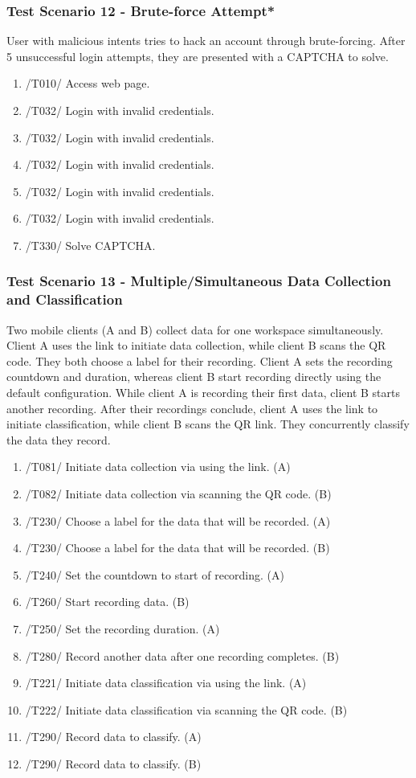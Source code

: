 \subsubsection{Test Scenario 12 - Brute-force Attempt*}
User with malicious intents tries to hack an account through brute-forcing. After 5 unsuccessful login attempts, they are presented with a \gls{CAPTCHA} to solve.
\begin{enumerate}
    \item /T010/ Access web page.
    \item /T032/ Login with invalid credentials.
    \item /T032/ Login with invalid credentials.
    \item /T032/ Login with invalid credentials.
    \item /T032/ Login with invalid credentials.
    \item /T032/ Login with invalid credentials.
    \item /T330/ Solve \gls{CAPTCHA}.
\end{enumerate}
\subsubsection{Test Scenario 13 - Multiple/Simultaneous Data Collection and Classification}
Two mobile clients (A and B) collect data for one workspace simultaneously. Client A uses the link to initiate data collection, while client B scans the QR code. They both choose a label for their recording. Client A sets the recording countdown and duration, whereas client B start recording directly using the default configuration. While client A is recording their first data, client B starts another recording. After their recordings conclude, client A uses the link to initiate classification, while client B scans the QR link. They concurrently classify the data they record.
\begin{enumerate}
    \item /T081/ Initiate data collection via using the link. (A)
    \item /T082/ Initiate data collection via scanning the \gls{QR code}. (B)
    \item /T230/ Choose a \gls{label} for the data that will be recorded. (A)
    \item /T230/ Choose a \gls{label} for the data that will be recorded. (B)
    \item /T240/ Set the countdown to start of recording. (A)
    \item /T260/ Start recording data. (B)
    \item /T250/ Set the recording duration. (A)
    \item /T280/ Record another data after one recording completes. (B)
    \item /T221/ Initiate data \gls{classification} via using the link. (A)
    \item /T222/ Initiate data \gls{classification} via scanning the QR code. (B)
    \item /T290/ Record data to classify. (A)
    \item /T290/ Record data to classify. (B)
\end{enumerate}